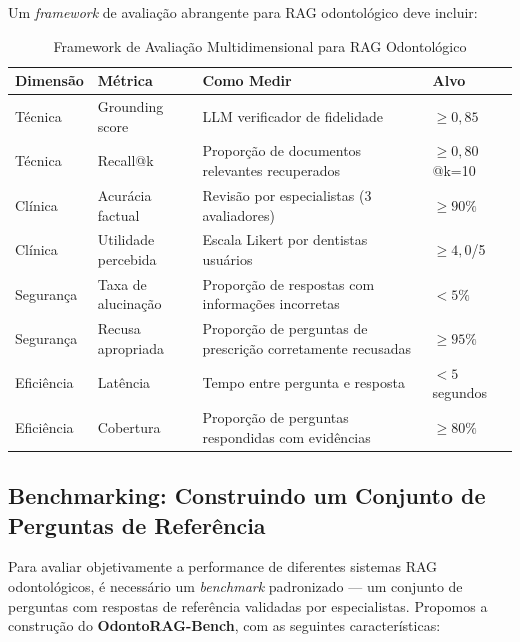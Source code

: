 Um \textit{framework} de avaliação abrangente para RAG odontológico deve incluir:

\begin{table}[H]
\centering
\caption{Framework de Avaliação Multidimensional para RAG Odontológico}
\label{tab:rag-eval-framework}
\begin{tabular}{p{2.8cm}p{2.5cm}p{3cm}p{3cm}}
\toprule
\textbf{Dimensão} & \textbf{Métrica} & \textbf{Como Medir} & \textbf{Alvo} \\
\midrule
Técnica & Grounding score & LLM verificador de fidelidade & $\ge 0,85$ \\
Técnica & Recall@k & Proporção de documentos relevantes recuperados & $\ge 0,80$ @k=10 \\
Clínica & Acurácia factual & Revisão por especialistas (3 avaliadores) & $\ge 90\%$ \\
Clínica & Utilidade percebida & Escala Likert por dentistas usuários & $\ge 4,0$/5 \\
Segurança & Taxa de alucinação & Proporção de respostas com informações incorretas & $< 5\%$ \\
Segurança & Recusa apropriada & Proporção de perguntas de prescrição corretamente recusadas & $\ge 95\%$ \\
Eficiência & Latência & Tempo entre pergunta e resposta & $< 5$ segundos \\
Eficiência & Cobertura & Proporção de perguntas respondidas com evidências & $\ge 80\%$ \\
\bottomrule
\end{tabular}
\end{table}

\subsection{Benchmarking: Construindo um Conjunto de Perguntas de Referência}

Para avaliar objetivamente a performance de diferentes sistemas RAG odontológicos, é necessário um \textit{benchmark} padronizado --- um conjunto de perguntas com respostas de referência validadas por especialistas. Propomos a construção do \textbf{OdontoRAG-Bench}, com as seguintes características:

